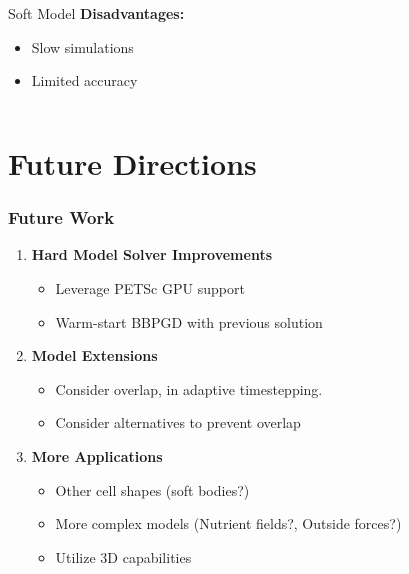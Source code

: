\documentclass[10pt,t]{beamer}
\begin{document}
\begin{frame}
\begin{columns}
\begin{column}{0.5\textwidth}
\begin{alertblock}{Soft Model}
                \textbf{Disadvantages:}
                \begin{itemize}
                    \item Slow simulations
                    \item Limited accuracy
                \end{itemize}
            \end{alertblock}
        \end{column}
    \end{columns}

\end{frame}


\section{Future Directions}

\begin{frame}
    \frametitle{Future Work}

    \begin{enumerate}
        \item \textbf{Hard Model Solver Improvements}
              \begin{itemize}
                  \item Leverage PETSc GPU support
                  \item Warm-start BBPGD with previous solution
              \end{itemize}

              \vspace{0.3cm}

        \item \textbf{Model Extensions}
              \begin{itemize}
                  \item Consider overlap, in adaptive timestepping.
                  \item Consider alternatives to prevent overlap
              \end{itemize}

              \vspace{0.3cm}

        \item \textbf{More Applications}
              \begin{itemize}
                  \item Other cell shapes (soft bodies?)
                  \item More complex models (Nutrient fields?, Outside forces?)
                  \item Utilize 3D capabilities
              \end{itemize}
    \end{enumerate}

\end{frame}
\end{document}

